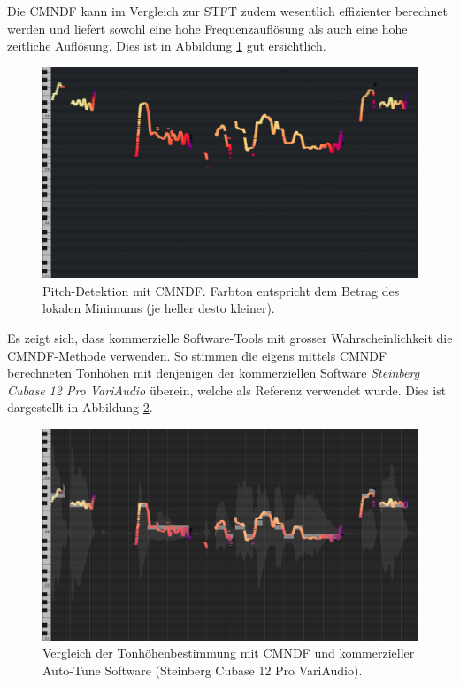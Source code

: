 Die CMNDF kann im Vergleich zur STFT zudem wesentlich effizienter berechnet werden und liefert sowohl eine hohe Frequenzauflösung als auch eine hohe zeitliche Auflösung.
Dies ist in Abbildung \ref{autotune:fig:pitchDetektionCMNDF} gut ersichtlich.
\begin{figure}
	\centering
	\includegraphics[width=\textwidth]{papers/autotune/images/Pianoscale_Example_Detuned_CMNDF.png}
	\caption{Pitch-Detektion mit CMNDF. Farbton entspricht dem Betrag des lokalen Minimums (je heller desto kleiner).}
    \label{autotune:fig:pitchDetektionCMNDF}
\end{figure}

Es zeigt sich, dass kommerzielle Software-Tools mit grosser Wahrscheinlichkeit die CMNDF-Methode verwenden.
So stimmen die eigens mittels CMNDF berechneten Tonhöhen mit denjenigen der kommerziellen Software \textit{Steinberg Cubase 12 Pro VariAudio} überein,
welche als Referenz verwendet wurde. Dies ist dargestellt in Abbildung \ref{autotune:fig:pitchDetektionCMNDFReference}.
\begin{figure}
	\centering
	\includegraphics[width=\textwidth]{papers/autotune/images/Pianoscale_Example_Detuned_CMNDF_Reference.png}
	\caption{Vergleich der Tonhöhenbestimmung mit CMNDF und kommerzieller Auto-Tune Software (Steinberg Cubase 12 Pro VariAudio).}
    \label{autotune:fig:pitchDetektionCMNDFReference}
\end{figure}
